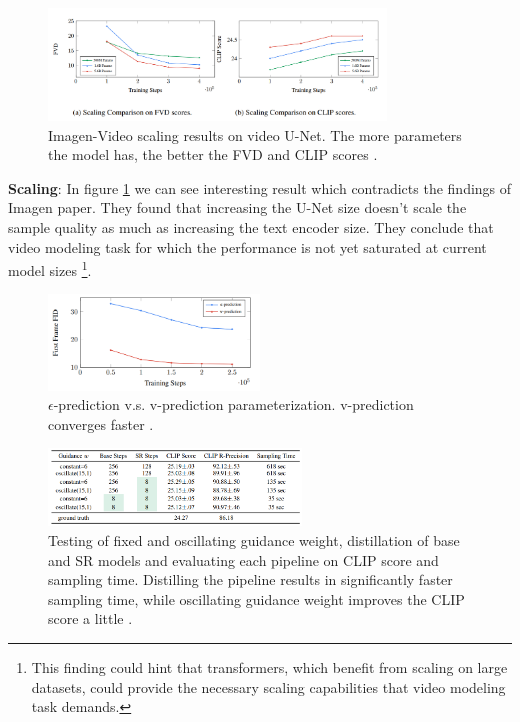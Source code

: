 \begin{figure}
    \centering
    \includegraphics[width=0.8\textwidth]{images/imagen_video/scaling.png}
    \caption{Imagen-Video scaling results on video U-Net. The more parameters the model has, the better the FVD and CLIP scores \cite{imagen_video}.}
    \label{fig:imagen_video_scaling}
\end{figure}

\textbf{Scaling}: In figure \ref{fig:imagen_video_scaling} we can see interesting result which contradicts the findings of Imagen \cite{imagen} paper. They found that increasing the U-Net size doesn't scale the sample quality as much as increasing the text encoder size. They conclude that video modeling task for which the performance is not yet saturated at current model sizes \footnote{This finding could hint that transformers, which benefit from scaling on large datasets, could provide the necessary scaling capabilities that video modeling task demands.}.

\begin{figure}
    \centering
    \includegraphics[width=0.5\textwidth]{images/imagen_video/e_prediction_vs_v_prediction_2.png}
    \caption{$\epsilon$-prediction v.s. v-prediction parameterization. v-prediction converges faster \cite{imagen_video}.}
\end{figure}

\begin{figure}
    \centering
    \includegraphics[width=0.6\textwidth]{images/imagen_video/experiments_table.png}
    \caption{Testing of fixed and oscillating guidance weight, distillation of base and SR models and evaluating each pipeline on CLIP score and sampling time. Distilling the pipeline results in significantly faster sampling time, while oscillating guidance weight improves the CLIP score a little \cite{imagen_video}.}
    \label{fig:imagen_video_experiments_table}
\end{figure}

